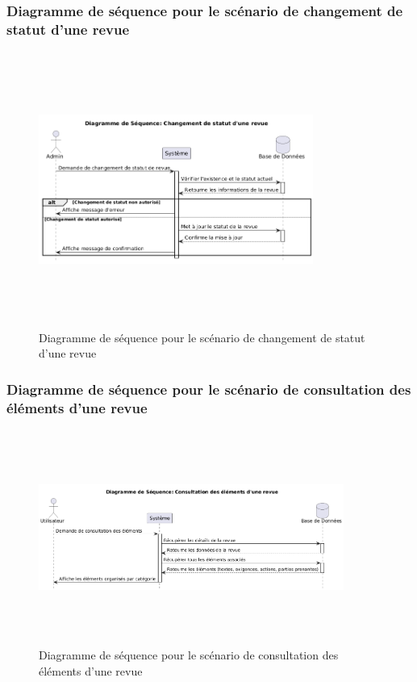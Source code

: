\subsubsection{Diagramme de séquence pour le scénario de changement de statut d'une revue}
\begin{figure}[H]
    \centering
    \includegraphics[width=9cm,height=9cm]{images/changestatusrevueseq.png}
    \caption{Diagramme de séquence pour le scénario de changement de statut d'une revue}
\end{figure}

\subsubsection{Diagramme de séquence pour le scénario de consultation des éléments d'une revue}
\begin{figure}[H]
    \centering
    \includegraphics[width=10cm,height=7cm]{images/consultelementrevueseq.png}
    \caption{Diagramme de séquence pour le scénario de consultation des éléments d'une revue}
\end{figure}

